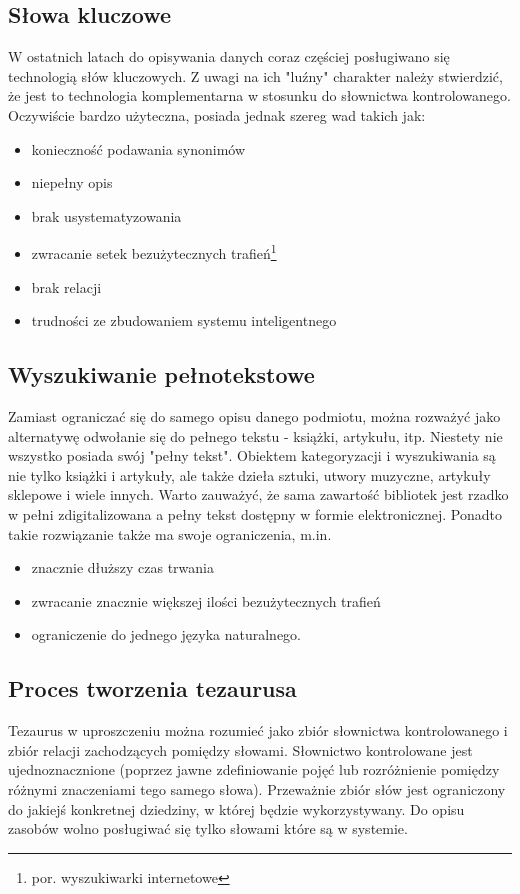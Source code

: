 \documentclass[12pt,a4paper,notitlepage]{article}
\begin{document}
\subsection{Słowa kluczowe}
W ostatnich latach do opisywania danych coraz częściej posługiwano się technologią słów kluczowych. Z uwagi na ich "luźny" charakter należy stwierdzić, że jest to technologia komplementarna w stosunku do słownictwa kontrolowanego\cite{KasperekKonf}. Oczywiście bardzo użyteczna, posiada jednak szereg wad takich jak:
\begin{itemize}
   \item konieczność podawania synonimów
	\item niepełny opis
	\item brak usystematyzowania
	\item zwracanie setek bezużytecznych trafień\footnote{por. wyszukiwarki internetowe}
	\item brak relacji
	\item trudności ze zbudowaniem systemu inteligentnego
\end{itemize}    

\subsection{Wyszukiwanie pełnotekstowe}
Zamiast ograniczać się do samego opisu danego podmiotu, można rozważyć jako alternatywę odwołanie się do pełnego tekstu - książki, artykułu, itp. Niestety nie wszystko posiada swój "pełny tekst". Obiektem kategoryzacji i wyszukiwania są nie tylko książki i artykuły, ale także dzieła sztuki, utwory muzyczne, artykuły sklepowe i wiele innych. Warto zauważyć, że sama zawartość bibliotek jest rzadko w pełni zdigitalizowana a pełny tekst dostępny w formie elektronicznej. Ponadto takie rozwiązanie także ma swoje ograniczenia, m.in.
 \begin{itemize}
   \item znacznie dłuższy czas trwania
	\item zwracanie znacznie większej ilości bezużytecznych trafień
	\item ograniczenie do jednego języka naturalnego.
\end{itemize}

\subsection{Proces tworzenia tezaurusa}
Tezaurus w uproszczeniu można rozumieć jako zbiór słownictwa kontrolowanego i zbiór relacji zachodzących pomiędzy słowami.
Słownictwo kontrolowane jest ujednoznacznione (poprzez jawne zdefiniowanie pojęć lub rozróżnienie pomiędzy różnymi znaczeniami tego samego słowa). Przeważnie zbiór słów jest ograniczony do jakiejś konkretnej dziedziny, w której będzie wykorzystywany. Do opisu zasobów wolno posługiwać się tylko słowami które są w systemie. 
\end{document}
